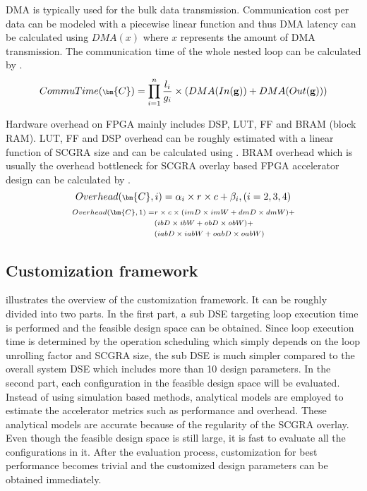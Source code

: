 DMA is typically used for the bulk data transmission. Communication cost per 
data can be modeled with a piecewise linear function and thus DMA latency can be 
calculated using $DMA(x)$ where $x$ represents the amount of DMA transmission. The communication
time of the whole nested loop can be calculated by .
\begin{equation} \label{eq:commu}
    \scriptsize
    CommuTime(\bm{C})=\displaystyle \prod_{i=1}^{n} \frac{l_i}{g_i} \times 
    (DMA(In(\mathbf{g}))+DMA(Out(\mathbf{g})))
\end{equation}

Hardware overhead on FPGA mainly includes DSP, LUT, FF and 
BRAM (block RAM). LUT, FF and DSP overhead can be roughly estimated 
with a linear function of SCGRA size and can be calculated using . 
BRAM overhead which is usually the overhead bottleneck for SCGRA overlay based 
FPGA accelerator design can be calculated by .
\begin{equation} \label{eq:dsplutff}
    \scriptsize
    Overhead(\bm{C}, i)=\alpha_i \times r \times c + \beta_i, (i=2,3,4)
\end{equation}
\begin{equation} \label{eq:bramoverhead}
    \scriptsize
    \begin{split}
        Overhead(\bm{C}, 1)=&r \times c \times (imD \times imW + dmD \times dmW) + \\
                               &(ibD \times ibW + obD \times obW) + \\
                               &(iabD \times iabW + oabD \times oabW) 
    \end{split}
\end{equation}
\subsection{Customization framework}
 illustrates the overview of the 
customization framework. It can be roughly divided into two 
parts. In the first part, a sub DSE targeting loop execution time 
is performed and the feasible design space can be obtained. Since loop 
execution time is determined by the operation scheduling 
which simply depends on the loop unrolling factor and SCGRA size, the 
sub DSE is much simpler compared to the overall system DSE which includes more than 10 design
parameters. In the second part, each configuration 
in the feasible design space will be evaluated. Instead of using simulation 
based methods, analytical models are employed to estimate the accelerator 
metrics such as performance and overhead. These analytical models are accurate because of the
regularity of the SCGRA overlay. Even though the feasible design space is still large, it is fast to evaluate 
all the configurations in it. After the evaluation process, customization for best performance
becomes trivial and the customized design parameters can be obtained immediately.

